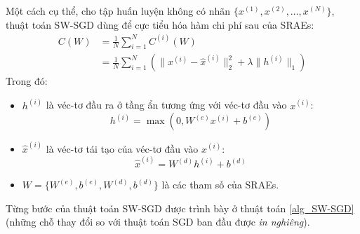 Một cách cụ thể, cho tập huấn luyện không có nhãn $\{x^{(1)}, x^{(2)}, \ldots, x^{(N)}\}$, thuật toán SW-SGD dùng để cực tiểu hóa hàm chi phí sau của SRAEs:
\begin{equation}
\begin{split}
	C(W) &= \frac{1}{N}\sum_{i=1}^N C^{(i)}(W)\\
		 &= \frac{1}{N}\sum_{i=1}^N\left(\|x^{(i)} - \hat{x}^{(i)}\|_2^2 + \lambda \|h^{(i)}\|_1\right)
\end{split}
\end{equation}
Trong đó:
\begin{itemize}
	\item $h^{(i)}$ là véc-tơ đầu ra ở tầng ẩn tương ứng với véc-tơ đầu vào $x^{(i)}$: \[h^{(i)} = \max\left(0, W^{(e)}x^{(i)} + b^{(e)}\right)\]
	\item $\hat{x}^{(i)}$ là véc-tơ tái tạo của véc-tơ đầu vào $x^{(i)}$: \[\hat{x}^{(i)} = W^{(d)}h^{(i)} + b^{(d)}\]
	\item $W=\{W^{(e)}, b^{(e)}, W^{(d)}, b^{(d)}\}$ là các tham số của SRAEs.
\end{itemize}
Từng bước của thuật toán SW-SGD được trình bày ở thuật toán \ref{alg_SW-SGD} (những chỗ thay đổi so với thuật toán SGD ban đầu được \emph{in nghiêng}).
